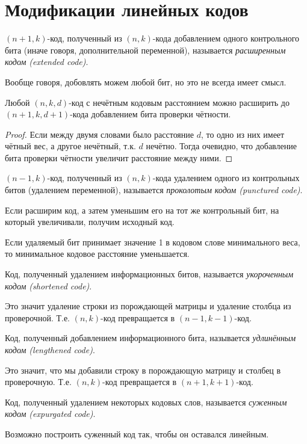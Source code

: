 \section{Модификации линейных кодов}
\begin{definition}
$\left(n+1,k\right)$-код, полученный из $\left(n,k\right)$-кода
добавлением одного контрольного бита (иначе говоря, дополнительной
переменной), называется \emph{расширенным кодом (extended code)}.
\end{definition}
Вообще говоря, добовлять можем любой бит, но это не всегда имеет смысл.
\begin{proposition}
Любой $\left(n,k,d\right)$-код с нечётным кодовым расстоянием можно
расширить до $\left(n+1,k,d+1\right)$-кода добавлением бита проверки
чётности.\end{proposition}
\begin{proof}
Если между двумя словами было расстояние $d$, то одно из них имеет
чётный вес, а другое нечётный, т.к. $d$ нечётно. Тогда очевидно,
что добавление бита проверки чётности увеличит расстояние между ними.\end{proof}
\begin{definition}
$\left(n-1,k\right)$-код, полученный из $\left(n,k\right)$-кода
удалением одного из контрольных битов (удалением переменной), называется
\emph{проколотым кодом (punctured code)}.
\end{definition}
Если расширим код, а затем уменьшим его на тот же контрольный бит,
на который увеличивали, получим исходный код.



Если удаляемый бит принимает значение 1 в кодовом слове минимального
веса, то минимальное кодовое расстояние уменьшается.


\begin{definition}
Код, полученный удалением информационных битов, называется \emph{укороченным
кодом (shortened code)}.
\end{definition}
Это значит удаление строки из порождающей матрицы и удаление столбца
из проверочной. Т.е. $\left(n,k\right)$-код превращается в $\left(n-1,k-1\right)$-код.
\begin{definition}
Код, полученный добавлением информационного бита, называется \emph{удлинённым
кодом (lengthened code)}.
\end{definition}
Это значит, что мы добавили строку в порождающую матрицу и столбец
в проверочную. Т.е. $\left(n,k\right)$-код превращается в $\left(n+1,k+1\right)$-код.
\begin{definition}
Код, полученный удалением некоторых кодовых слов, называется \emph{суженным
кодом (expurgated code)}.
\end{definition}
Возможно построить суженный код так, чтобы он оставался линейным.



